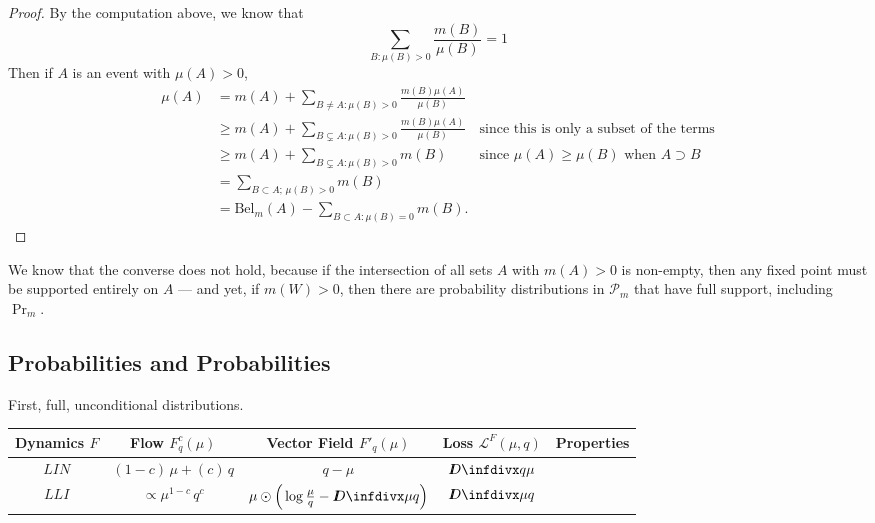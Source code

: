 \documentclass{article}
\begin{document}
\begin{computation}
\begin{proof}
    

    By the computation above, we know that
    \[ 
        \sum_{B : \mu(B) > 0} \frac{m(B)}{\mu(B)} = 1
    \]
    Then if $A$ is an event with $\mu(A) > 0$,
    \begin{align*}
        \mu(A) &= m(A) + \sum_{B \ne A: \mu(B) > 0} \frac{m(B) \mu(A)}{\mu(B)} \\
        &\ge m(A) + \sum_{B \subsetneq A: \mu(B) > 0} \frac{m(B) \mu(A)}{\mu(B)} 
            &\text{since this is only a subset of the terms}\\
        &\ge m(A) + \sum_{B \subsetneq A: \mu(B) > 0} m(B)
            &\text{since $\mu(A) \ge \mu(B)$ when $A \supset B$} \\
        &= \sum_{B \subset A;\,\mu(B)>0} m(B)  \\
        &= \mathrm{Bel}_m(A) - \sum_{B \subset A : \mu(B) = 0} m(B).
    \end{align*}
    
\end{proof}
We know that the converse does not hold, because if the intersection of all sets $A$ with $m(A) > 0$ is non-empty, then any fixed point must be supported entirely on $A$ --- and yet, if $m(W) > 0$, then there are probability distributions in $\mathcal P_m$ that have full support, including $\Pr_m$. 

 
\end{computation}



\subsection{Probabilities and Probabilities}

First, full, unconditional distributions. 
\begin{center}
\begin{tabular}{c|ccc|c}\toprule
    Dynamics $F$ & Flow $F^c_q(\mu)$
        & Vector Field $F'_q(\mu)$
        & Loss $\mathcal L^{F}(\mu, q)$
        & Properties
        \\\midrule
    $\mathit{LIN}$
        & $%
            (1-c)\,\mu + (c)\, q$
        & $%
            q - \mu$
        & $%
            \kldiv{q}{\mu}$
        & \\ 
    $\mathit{LLI}$
        & $\propto
            \mu^{1-c}\, q^c$
        & $\mu \odot \Big( \log \frac\mu q - \kldiv\mu q \Big)$ 
        & $\kldiv\mu q$ 
        &\\
    \bottomrule
\end{tabular}
\end{center}
\end{document}
